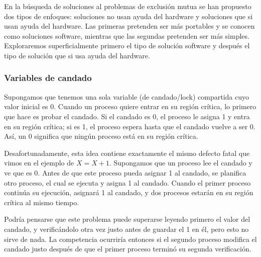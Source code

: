 \documentclass{article}
\begin{document}
En la b\'usqueda de soluciones al problemas de exclusi\'on mutua se 
han pro\-pues\-to dos tipos de enfoques: soluciones no usan ayuda del 
hardware y soluciones que si usan ayuda del hardware. Las primeras 
pretenden ser m\'as portables y se conocen como soluciones software, 
mientras que las segundas pretenden ser m\'as simples. Exploraremos 
superf\/icialmente primero el tipo de soluci\'on software y despu\'es 
el tipo de soluci\'on que si usa ayuda del hardware.

\subsubsection*{Variables de candado}
Supongamos que tenemos una sola variable (de candado/lock) compartida 
cuyo valor inicial es 0. Cuando un proceso quiere entrar en su regi\'on 
cr\'itica, lo primero que hace es probar el candado. Si el candado es 0, 
el proceso le asigna 1 y entra en su regi\'on cr\'itica; si es 1, el 
proceso espera hasta que el candado vuelve a ser 0. As\'i, un 0 significa 
que ning\'un proceso est\'a en su regi\'on cr\'itica.

Desafortunadamente, esta idea contiene exactamente el mismo defecto 
fatal que vimos en el ejemplo de $X=X+1$. Supongamos que un proceso lee 
el candado y ve que es 0. Antes de que este proceso pueda asignar 1 al 
candado, se planifica otro proceso, el cual se ejecuta y asigna 1 al 
candado. Cuando el primer proceso contin\'ua su ejecuci\'on, asignar\'a 
1 al candado, y dos procesos estar\'an en su regi\'on cr\'itica al mismo 
tiempo.

Podr\'ia pensarse que este problema puede superarse leyendo primero el 
valor del candado, y verific\'andolo otra vez justo antes de guardar el 
1 en \'el, pero esto no sirve de nada. La competencia ocurrir\'ia entonces 
si el segundo proceso modif\/ica el candado justo despu\'es de que el primer 
proceso termin\'o su segunda verif\/icaci\'on.
\end{document}
